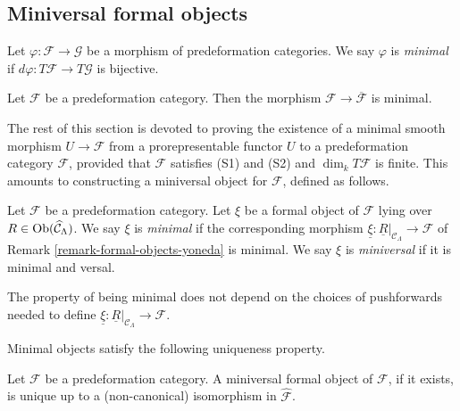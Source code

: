 \subsection{Miniversal formal objects}
\label{subsection-miniversal-objects-existence}

\begin{definition}
\label{definition-minimal-morphism}
Let $\varphi: \mathcal F \rightarrow \mathcal G$ be a morphism of 
predeformation categories.  We say $\varphi$ is {\it minimal} if $d \varphi: 
 T \mathcal F \rightarrow T \mathcal G$ is bijective.
\end{definition}

\begin{remark}
\label{remark-predeformation-category-minimal-over-iso}
Let $\mathcal F$ be a predeformation category.  Then the morphism $\mathcal F 
\rightarrow \overline{\mathcal F}$ is minimal.
\end{remark}

\noindent
The rest of this section is devoted to proving the existence of a minimal 
smooth morphism $U \rightarrow \mathcal F$ from a prorepresentable functor $U$ 
to a predeformation category $\mathcal F$, provided that $\mathcal F$ satisfies 
(S1) and (S2) and $\dim_{k} T\mathcal F$ is finite.  This amounts to 
constructing a miniversal object for $\mathcal F$, defined as follows.

\begin{definition}
\label{definition-miniversal-object}
Let $\mathcal F$ be a predeformation category.  Let $\xi$ be a formal object of 
$\mathcal F$ lying over $R \in \textnormal{Ob}(\widehat{\mathcal 
C}_{\Lambda})$.  We say $\xi$ is {\it minimal} if the corresponding morphism 
$\underline{\xi}: \underline{R}|_{\mathcal C_{\Lambda}} \rightarrow \mathcal F$ 
of Remark \ref{remark-formal-objects-yoneda} is minimal.  We say $\xi$ is 
{\it miniversal} if it is minimal and versal.
\end{definition}

\begin{remark}
\label{remark-choice-pushforwards-iso-class}
The property of being minimal does not depend on the choices of pushforwards 
needed to define $\underline{\xi}: \underline{R}|_{\mathcal C_{\Lambda}} 
\rightarrow \mathcal F$.
\end{remark}

\noindent
Minimal objects satisfy the following uniqueness property.

\begin{lemma}
\label{lemma-miniversal-object-unique}
Let $\mathcal F$ be a predeformation category.  A miniversal formal object of 
$\mathcal F$, if it exists, is unique up to a (non-canonical) isomorphism in 
$\widehat{\mathcal F}$.
\end{lemma}

